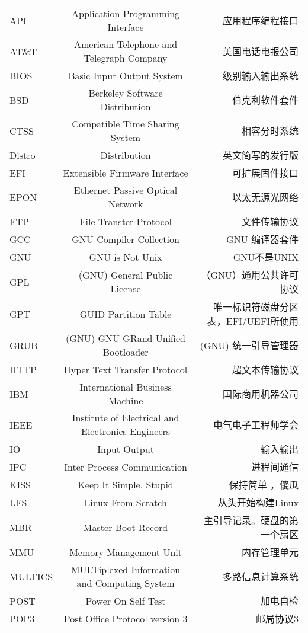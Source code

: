 \begin{landscape}
\begin{center}
\begin{supertabular}{l|c|r}
API & Application Programming Interface & 应用程序编程接口 \\
AT\&T & American Telephone and Telegraph Company & 美国电话电报公司\\
BIOS & Basic Input Output System & 级别输入输出系统\\
BSD & Berkeley Software Distribution & 伯克利软件套件 \\
CTSS & Compatible Time Sharing System & 相容分时系统 \\
Distro & Distribution & 英文简写的发行版 \\
EFI & Extensible Firmware Interface & 可扩展固件接口 \\
EPON & Ethernet Passive Optical Network & 以太无源光网络\\
FTP & File Transter Protocol & 文件传输协议 \\
GCC & GNU Compiler Collection & GNU 编译器套件 \\
GNU & GNU is Not Unix & GNU不是UNIX \\
GPL & (GNU) General Public License & （GNU）通用公共许可协议 \\
GPT & GUID Partition Table & 唯一标识符磁盘分区表，EFI/UEFI所使用\\
GRUB & (GNU) GNU GRand Unified Bootloader & (GNU) 统一引导管理器 \\
HTTP & Hyper Text Transfer Protocol & 超文本传输协议 \\
IBM & International Business Machine & 国际商用机器公司 \\
IEEE & Institute of Electrical and Electronics Engineers  & 电气电子工程师学会\\
IO & Input Output & 输入输出 \\
IPC & Inter Process Communication & 进程间通信 \\
KISS & Keep It Simple, Stupid& 保持简单 ，傻瓜 \\

LFS & Linux From Scratch & 从头开始构建Linux \\
MBR & Master Boot Record & 主引导记录。硬盘的第一个扇区 \\
MMU & Memory Management Unit & 内存管理单元 \\

MULTICS & MULTiplexed Information and Computing System & 多路信息计算系统 \\
POST & Power On Self Test & 加电自检\\
POP3 & Post Office Protocol version 3 & 邮局协议3\\


\end{supertabular}
\end{center}
\end{landscape}
